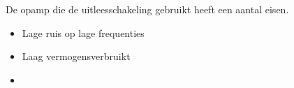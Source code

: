 De opamp die de uitleesschakeling gebruikt heeft een aantal eisen.
\begin{itemize}
    \item Lage ruis op lage frequenties
    \item Laag vermogensverbruikt
    \item 
\end{itemize}